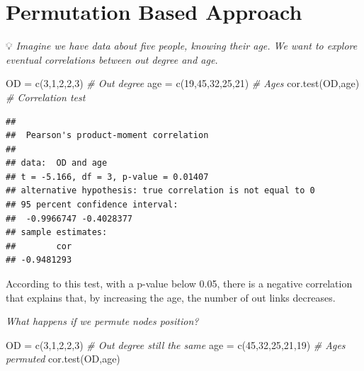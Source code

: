 \documentclass[
  notitlepage,
  onecolumn,
  openany]{book}
\newenvironment{Shaded}{\begin{snugshade}}{\end{snugshade}}
\newcommand{\CommentTok}[1]{\textcolor[rgb]{0.56,0.35,0.01}{\textit{#1}}}
\newcommand{\DecValTok}[1]{\textcolor[rgb]{0.00,0.00,0.81}{#1}}
\newcommand{\FunctionTok}[1]{\textcolor[rgb]{0.00,0.00,0.00}{#1}}
\newcommand{\NormalTok}[1]{#1}
\newcommand{\OtherTok}[1]{\textcolor[rgb]{0.56,0.35,0.01}{#1}}
\begin{document}
\hypertarget{permutation-based-approach}{%
\section{Permutation Based Approach}\label{permutation-based-approach}}

💡 \emph{Imagine we have data about five people, knowing their age. We want to explore eventual correlations between out degree and age.}

\begin{Shaded}
\begin{Highlighting}[]
\NormalTok{OD }\OtherTok{=} \FunctionTok{c}\NormalTok{(}\DecValTok{3}\NormalTok{,}\DecValTok{1}\NormalTok{,}\DecValTok{2}\NormalTok{,}\DecValTok{2}\NormalTok{,}\DecValTok{3}\NormalTok{) }\CommentTok{\# Out degree}
\NormalTok{age }\OtherTok{=} \FunctionTok{c}\NormalTok{(}\DecValTok{19}\NormalTok{,}\DecValTok{45}\NormalTok{,}\DecValTok{32}\NormalTok{,}\DecValTok{25}\NormalTok{,}\DecValTok{21}\NormalTok{) }\CommentTok{\# Ages}
\FunctionTok{cor.test}\NormalTok{(OD,age) }\CommentTok{\# Correlation test}
\end{Highlighting}
\end{Shaded}

\begin{verbatim}
## 
##  Pearson's product-moment correlation
## 
## data:  OD and age
## t = -5.166, df = 3, p-value = 0.01407
## alternative hypothesis: true correlation is not equal to 0
## 95 percent confidence interval:
##  -0.9966747 -0.4028377
## sample estimates:
##        cor 
## -0.9481293
\end{verbatim}

According to this test, with a p-value below 0.05, there is a negative correlation that explains that, by increasing the age, the number of out links decreases.

\emph{What happens if we permute nodes position?}

\begin{Shaded}
\begin{Highlighting}[]
\NormalTok{OD }\OtherTok{=} \FunctionTok{c}\NormalTok{(}\DecValTok{3}\NormalTok{,}\DecValTok{1}\NormalTok{,}\DecValTok{2}\NormalTok{,}\DecValTok{2}\NormalTok{,}\DecValTok{3}\NormalTok{) }\CommentTok{\# Out degree still the same}
\NormalTok{age }\OtherTok{=} \FunctionTok{c}\NormalTok{(}\DecValTok{45}\NormalTok{,}\DecValTok{32}\NormalTok{,}\DecValTok{25}\NormalTok{,}\DecValTok{21}\NormalTok{,}\DecValTok{19}\NormalTok{) }\CommentTok{\# Ages permuted}
\FunctionTok{cor.test}\NormalTok{(OD,age)}
\end{Highlighting}
\end{Shaded}
\end{document}
